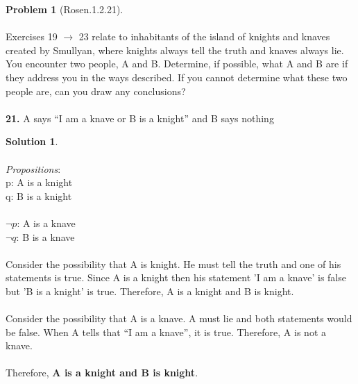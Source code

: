 \documentclass{article}
\theoremstyle{definition}
\newtheorem*{problem}{Problem}
\newtheorem*{solution}{Solution}
\begin{document}
\begin{problem}[Rosen.1.2.21]\ \\
\ \\
Exercises 19 $\rightarrow$ 23 relate to inhabitants of the island of knights
and knaves created by Smullyan, where knights always tell
the truth and knaves always lie. You encounter two people,
A and B. Determine, if possible, what A and B are if they
address you in the ways described. If you cannot determine
what these two people are, can you draw any conclusions?\ \\
\ \\
\textbf{21.} A says “I am a knave or B is a knight” and B says nothing
\begin{compactenum}
\renewcommand{\theenumi}{\alph{enumi}}

\end{compactenum}
\end{problem}

\begin{solution}\ \\
\ \\
\textit{Propositions}:\ \\
p: A is a knight\ \\
q: B is a knight\ \\
\ \\
$\neg p$: A is a knave\ \\
$\neg q$: B is a knave\ \\
\ \\
Consider the possibility that A is knight. He must tell the truth and one of his statements is true. Since A is a knight then his statement 'I am a knave' is false but 'B is a knight' is true. Therefore, A is a knight and B is knight.\ \\
\ \\
Consider the possibility that A is a knave. A must lie and both statements would be false. When A tells that “I am a knave”, it is true. Therefore, A is not a knave.\ \\
\ \\
Therefore, \textbf{A is a knight and B is knight}.

\begin{compactenum}
\renewcommand{\theenumi}{\alph{enumi}}


\end{compactenum}
\end{solution}
\end{document}

